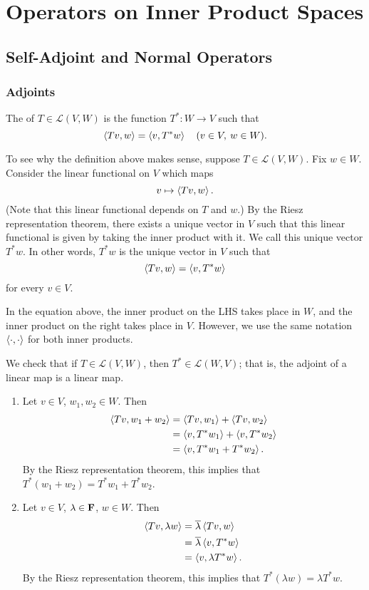\chapter{Operators on Inner Product Spaces}\label{chap:operators-inner-product-spaces}
\section{Self-Adjoint and Normal Operators}
\subsection{Adjoints}
\begin{definition}[Adjoint]
The  of $T\in\mathcal{L}(V,W)$ is the function $T^*\colon W\to V$ such that
\[\left\langle Tv,w\right\rangle=\left\langle v,T^*w\right\rangle\quad(v\in V,\:w\in W).\]
\end{definition}

To see why the definition above
makes sense, suppose $T\in\mathcal{L}(V,W)$. Fix $w\in W$. Consider the linear functional on $V$ which maps
\[v\mapsto\left\langle Tv,w\right\rangle.\]
(Note that this linear functional depends on $T$ and $w$.) 
By the Riesz representation theorem, there exists a unique vector in $V$ such that this linear functional is given by taking the inner product with it. We call this unique vector $T^*w$. In other words, $T^*w$ is the unique vector in $V$ such that
\[\left\langle Tv,w\right\rangle=\left\langle v,T^*w\right\rangle\]
for every $v\in V$.

\begin{remark}
In the equation above, the inner product on the LHS takes place in $W$, and the inner product on the right takes place in $V$. However, we use the same notation $\left\langle\cdot,\cdot\right\rangle$ for both inner products.
\end{remark}

We check that if $T\in\mathcal{L}(V,W)$, then $T^*\in\mathcal{L}(W,V)$; that is, the adjoint of a linear map is a linear map.
\begin{enumerate}[label=(\roman*)]
\item Let $v\in V$, $w_1,w_2\in W$. Then
\begin{align*}
\left\langle Tv,w_1+w_2\right\rangle
&=\left\langle Tv,w_1\right\rangle+\left\langle Tv,w_2\right\rangle\\
&=\left\langle v,T^*w_1\right\rangle+\left\langle v,T^*w_2\right\rangle\\
&=\left\langle v,T^*w_1+T^*w_2\right\rangle.
\end{align*}
By the Riesz representation theorem, this implies that $T^*(w_1+w_2)=T^*w_1+T^*w_2$.

\item Let $v\in V$, $\lambda\in\mathbf F$, $w\in W$. Then
\begin{align*}
\left\langle Tv,\lambda w\right\rangle
&=\overline{\lambda}\left\langle Tv,w\right\rangle\\
&=\overline{\lambda}\left\langle v,T^*w\right\rangle\\
&=\left\langle v,\lambda T^*w\right\rangle.
\end{align*}
By the Riesz representation theorem, this implies that $T^*(\lambda w)=\lambda T^*w$.
\end{enumerate}

